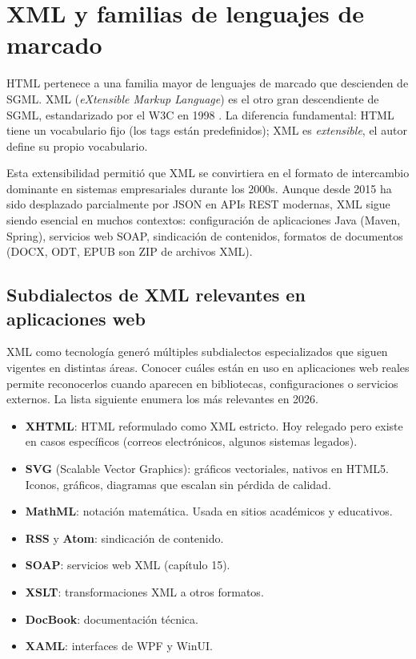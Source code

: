 \section{XML y familias de lenguajes de marcado}

HTML pertenece a una familia mayor de lenguajes de marcado que
descienden de SGML. XML (\emph{eXtensible Markup Language}) es el
otro gran descendiente de SGML, estandarizado por el W3C en 1998
\cite{w3c1998xml}. La diferencia fundamental: HTML tiene un
vocabulario fijo (los tags están predefinidos); XML es
\emph{extensible}, el autor define su propio vocabulario.

Esta extensibilidad permitió que XML se convirtiera en el formato
de intercambio dominante en sistemas empresariales durante los
2000s. Aunque desde 2015 ha sido desplazado parcialmente por JSON
en APIs REST modernas, XML sigue siendo esencial en muchos
contextos: configuración de aplicaciones Java (Maven, Spring),
servicios web SOAP, sindicación de contenidos, formatos de
documentos (DOCX, ODT, EPUB son ZIP de archivos XML).

\subsection{Subdialectos de XML relevantes en aplicaciones web}

XML como tecnología generó múltiples subdialectos
especializados que siguen vigentes en distintas áreas. Conocer cuáles
están en uso en aplicaciones web reales permite reconocerlos cuando
aparecen en bibliotecas, configuraciones o servicios externos. La
lista siguiente enumera los más relevantes en 2026.


\begin{itemize}
\item \textbf{XHTML}: HTML reformulado como XML estricto. Hoy
relegado pero existe en casos específicos (correos electrónicos,
algunos sistemas legados).
\item \textbf{SVG} (Scalable Vector Graphics): gráficos vectoriales,
nativos en HTML5. Iconos, gráficos, diagramas que escalan sin
pérdida de calidad.
\item \textbf{MathML}: notación matemática. Usada en sitios
académicos y educativos.
\item \textbf{RSS} y \textbf{Atom}: sindicación de contenido.
\item \textbf{SOAP}: servicios web XML (capítulo 15).
\item \textbf{XSLT}: transformaciones XML a otros formatos.
\item \textbf{DocBook}: documentación técnica.
\item \textbf{XAML}: interfaces de WPF y WinUI.
\end{itemize}

